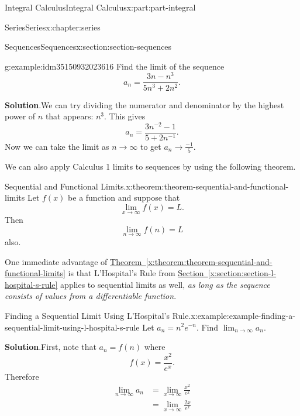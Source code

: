 \documentclass[twoside,10pt,]{tufte-book}
\newcommand{\blocktitlefont}{\relax}
\newcommand{\xreffont}{\relax}
\numberwithin{equation}{part}
\newcommand{\amp}{&}
\begin{document}
\begin{partptx}{Integral Calculus}{}{Integral Calculus}{}{}{x:part:part-integral}
\begin{chapterptx}{Series}{}{Series}{}{}{x:chapter:series}
\begin{sectionptx}{Sequences}{}{Sequences}{}{}{x:section:section-sequences}
\begin{example}{}{g:example:idm35150932023616}
Find the limit of the sequence%
\begin{equation*}
a_{n} = \frac{3n - n^{3}}{5n^{3} + 2n^{2}}.
\end{equation*}
%
\par\smallskip%
\noindent\textbf{\blocktitlefont Solution}.\hypertarget{g:solution:idm35150932022720}{}\quad{}We can try dividing the numerator and denominator by the highest power of \(n\) that appears: \(n^{3}\). This gives%
\begin{equation*}
a_{n} = \frac{3n^{-2} - 1}{5 + 2n^{-1}}\text{.}
\end{equation*}
Now we can take the limit as \(n\to\infty\) to get \(a_{n}\to\frac{-1}{5}\).%
\end{example}
We can also apply Calculus 1 limits to sequences by using the following theorem.%
\begin{theorem}{Sequential and Functional Limits.}{}{x:theorem:theorem-sequential-and-functional-limits}%
Let \(f(x)\) be a function and suppose that%
\begin{equation*}
\lim_{x\to\infty}f(x) = L\text{.}
\end{equation*}
Then%
\begin{equation*}
\lim_{n\to\infty}f(n) = L
\end{equation*}
also.%
\end{theorem}
One immediate advantage of \hyperref[x:theorem:theorem-sequential-and-functional-limits]{Theorem~{\xreffont\ref{x:theorem:theorem-sequential-and-functional-limits}}} is that L'Hospital's Rule from \hyperref[x:section:section-l-hospital-s-rule]{Section~{\xreffont\ref{x:section:section-l-hospital-s-rule}}} applies to sequential limits as well, \emph{as long as the sequence consists of values from a differentiable function}.%
\begin{example}{Finding a Sequential Limit Using L'Hospital's Rule.}{x:example:example-finding-a-sequential-limit-using-l-hospital-s-rule}%
Let \(a_{n} = n^{2}e^{-n}\). Find \(\lim_{n\to\infty}a_{n}\).%
\par\smallskip%
\noindent\textbf{\blocktitlefont Solution}.\hypertarget{g:solution:idm35150932080064}{}\quad{}First, note that \(a_{n} = f(n)\) where%
\begin{equation*}
f(x) = \frac{x^{2}}{e^{x}}\text{.}
\end{equation*}
Therefore%
%
\begin{align*}
\lim_{n\to\infty}a_{n} \amp = \lim_{x\to\infty}\frac{x^{2}}{e^{x}} \\
\amp = \lim_{x\to\infty}\frac{2x}{e^{x}} \\

\end{align*}
\end{example}
\end{sectionptx}
\end{chapterptx}
\end{partptx}
\end{document}
